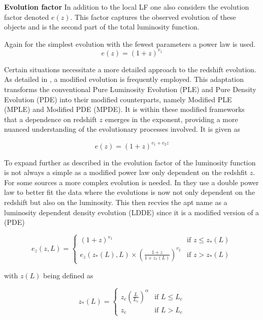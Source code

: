 \documentclass{article}
\begin{document}
\textbf{Evolution factor}
In addition to the local LF one also considers the evolution factor denoted $e(z)$. This factor captures the observed evolution of these objects and is the second part of the total luminosity function.

Again for the simplest evolution with the fewest parameters a power law is used.
 $$
e(z) = (1 + z)^{v_1 }
 $$


  
Certain situations necessitate a more detailed approach to the redshift evolution. 
 As detailed in \cite{Ajello_2009}, a modified evolution is frequently employed. 
 This adaptation transforms the conventional Pure Luminosity Evolution (PLE) and Pure Density Evolution 
 (PDE) into their modified counterparts, namely Modified PLE (MPLE) and Modified PDE (MPDE).
It is within these modified frameworks that a dependence on redshift $z$ emerges in the exponent,
providing a more nuanced understanding of the evolutionary processes involved. It is given as

$$
e(z) = (1 + z)^{v_1 +v_2 z }
 $$



 To expand further as described in \cite{Ueda_2003} the evolution factor of the luminosity function is not always a simple as a modified power law only dependent on the redshfit $z$.
For some sources a more complex evolution is needed. In \cite{Ueda_2003} they use a double power law to better fit the data where 
 the evolutions is now not only dependent on the redshift but also on the luminosity. This then recvies the apt name as a luminosity dependent density evolution (LDDE) since it is a modified version of a (PDE)


 \begin{equation}
    e_z(z, L) = 
    \begin{cases} 
    (1 + z)^{v_1} & \text{if } z \leq z_*(L) \\
    e_z(z_*(L), L) \times \left( \frac{1 + z}{1 + z_*(L)} \right)^{v_2} & \text{if } z >  z_*(L)
    \end{cases}
 \end{equation}

 with $z(L)$ being defined as

 \begin{equation}
    z_*(L) = 
    \begin{cases} 
    z_c \left( \frac{L}{L_c} \right)^\alpha & \text{if } L \leq L_c \\
    z_c & \text{if } L > L_c 
    \end{cases}
 \end{equation}
\end{document}
